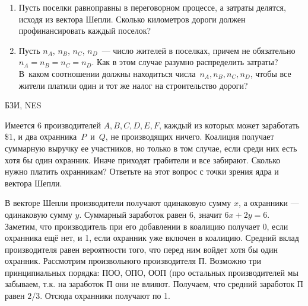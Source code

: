 \begin{problem} 
\begin{enumerate}
\item Пусть поселки равноправны в переговорном процессе, а
затраты делятся, исходя из вектора Шепли. Сколько
километров дороги должен профинансировать каждый поселок?

\item Пусть $n_A$, $n_B$, $n_C$, $n_D$~--- число жителей в
поселках, причем не обязательно $n_A=n_B=n_C=n_D$. Как в
этом случае разумно распределить затраты? В~каком
соотношении должны находиться числа~$n_A,n_B,n_C,n_D$,
чтобы все жители платили один и тот же налог на
строительство дороги?

\end{enumerate}








\begin{sol}

\end{sol}
\end{problem}




\begin{problem}[Охрана.]\begin{source}
БЗИ, NES
\end{source} Имеется $6$ производителей
$A,B,C,D,E,F$, каждый из которых может заработать~$\$1$, и
два охранника~$P$~и~$Q$, не производящих ничего. Коалиция
получает суммарную выручку ее участников, но только в том
случае, если среди них есть хотя бы один охранник. Иначе
приходят грабители и все забирают. Сколько нужно платить
охранникам? Ответьте на этот вопрос с точки зрения ядра и
вектора Шепли.







\begin{sol}
В векторе Шепли производители получают одинаковую сумму $x$, а охранники --- одинаковую сумму $y$. Суммарный заработок равен 6, значит $6x+2y=6$. Заметим, что производитель при его добавлении в коалицию получает 0, если охранника ещё нет, и 1, если охранник уже включен в коалицию. Средний вклад производителя равен вероятности того, что перед ним войдет хотя бы один охранник. Рассмотрим произвольного производителя П. Возможно три принципиальных порядка: ПОО, ОПО, ООП (про остальных производителей мы забываем, т.к. на заработок П они не влияют. Получаем, что средний заработок П равен $2/3$. Отсюда охранники получают по 1.


\end{sol}
\end{problem}




